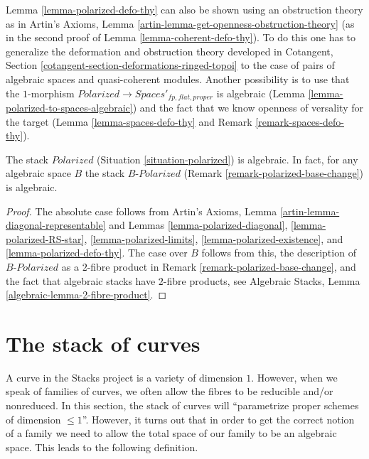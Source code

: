 \begin{remark}
\label{remark-polarized-defo-thy}
Lemma \ref{lemma-polarized-defo-thy} can also be shown
using an obstruction theory as in
Artin's Axioms, Lemma \ref{artin-lemma-get-openness-obstruction-theory}
(as in the second proof of Lemma \ref{lemma-coherent-defo-thy}).
To do this one has to generalize the deformation and obstruction theory
developed in
Cotangent, Section \ref{cotangent-section-deformations-ringed-topoi}
to the case of pairs of algebraic spaces and quasi-coherent modules.
Another possibility is to use that the $1$-morphism
$\textit{Polarized} \to \textit{Spaces}'_{fp, flat, proper}$
is algebraic (Lemma \ref{lemma-polarized-to-spaces-algebraic})
and the fact that we know openness of versality for the target
(Lemma \ref{lemma-spaces-defo-thy} and
Remark \ref{remark-spaces-defo-thy}).
\end{remark}

\begin{theorem}
\label{theorem-polarized-algebraic}
The stack $\textit{Polarized}$ (Situation \ref{situation-polarized})
is algebraic. In fact, for any algebraic space $B$ the stack
$B\textit{-Polarized}$ (Remark \ref{remark-polarized-base-change})
is algebraic.
\end{theorem}

\begin{proof}
The absolute case follows from
Artin's Axioms, Lemma \ref{artin-lemma-diagonal-representable}
and Lemmas \ref{lemma-polarized-diagonal},
\ref{lemma-polarized-RS-star},
\ref{lemma-polarized-limits},
\ref{lemma-polarized-existence}, and
\ref{lemma-polarized-defo-thy}.
The case over $B$ follows from this, the description of
$B\textit{-Polarized}$ as a $2$-fibre product in
Remark \ref{remark-polarized-base-change}, and the fact
that algebraic stacks have $2$-fibre products, see
Algebraic Stacks, Lemma \ref{algebraic-lemma-2-fibre-product}.
\end{proof}











\section{The stack of curves}
\label{section-curves}

\noindent
A curve in the Stacks project is a variety of dimension $1$.
However, when we speak of families of curves, we often allow
the fibres to be reducible and/or nonreduced. In this section,
the stack of curves will ``parametrize proper schemes of
dimension $\leq 1$''. However, it turns out that in order
to get the correct notion of a family we need to allow the
total space of our family to be an algebraic space.
This leads to the following definition.

